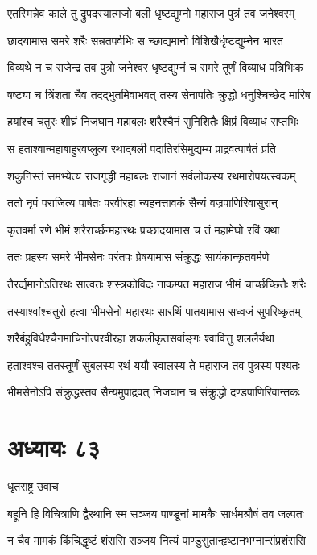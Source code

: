 \twolineshloka
{एतस्मिन्नेव काले तु द्रुपदस्यात्मजो बली}
{धृष्टद्युम्नो महाराज पुत्रं तव जनेश्वरम्}


\twolineshloka
{छादयामास समरे शरैः सन्नतपर्वभिः}
{स च्छाद्यमानो विशिखैर्धृष्टद्युम्नेन भारत}


\twolineshloka
{विव्यथे न च राजेन्द्र तव पुत्रो जनेश्वर}
{धृष्टद्युम्नं च समरे तूर्णं विव्याध पत्रिभिःक}


\twolineshloka
{षष्ट्या च त्रिंशता चैव तदद्भुतमिवाभवत्}
{तस्य सेनापतिः क्रुद्धो धनुश्चिच्छेद मारिष}


\twolineshloka
{हयांश्च चतुरः शीघ्रं निजघान महाबलः}
{शरैश्चैनं सुनिशितैः क्षिप्रं विव्याध सप्तभिः}


\twolineshloka
{स हताश्वान्महाबाहुरवप्लुत्य रथाद्बली}
{पदातिरसिमुद्यम्य प्राद्रवत्पार्षतं प्रति}


\twolineshloka
{शकुनिस्तं समभ्येत्य राजगृद्धी महाबलः}
{राजानं सर्वलोकस्य रथमारोपयत्स्वकम्}


\twolineshloka
{ततो नृपं पराजित्य पार्षतः परवीरहा}
{न्यहनत्तावकं सैन्यं वज्रपाणिरिवासुरान्}


\twolineshloka
{कृतवर्मा रणे भीमं शरैरार्च्छन्महारथः}
{प्रच्छादयामास च तं महामेघो रविं यथा}


\twolineshloka
{ततः प्रहस्य समरे भीमसेनः परंतपः}
{प्रेषयामास संक्रुद्धः सायंकान्कृतवर्मणे}


\twolineshloka
{तैरर्द्यमानोऽतिरथः सात्वतः शस्त्रकोविदः}
{नाकम्पत महाराज भीमं चार्च्छच्छितैः शरैः}


\twolineshloka
{तस्याश्वांश्चतुरो हत्वा भीमसेनो महारथः}
{सारथिं पातयामास सध्वजं सुपरिष्कृतम्}


\twolineshloka
{शरैर्बहुविधैश्चैनमाचिनोत्परवीरहा}
{शकलीकृतसर्वाङ्गः श्वावित्तु शललैर्यथा}


\twolineshloka
{हताश्वश्च ततस्तूर्णं सुबलस्य रथं ययौ}
{स्वालस्य ते महाराज तव पुत्रस्य पश्यतः}


\twolineshloka
{भीमसेनोऽपि संक्रुद्धस्तव सैन्यमुपाद्रवत्}
{निजघान च संक्रुद्धो दण्डपाणिरिवान्तकः}


\chapter{अध्यायः ८३}
\twolineshloka
{धृतराष्ट्र उवाच}
{}


\twolineshloka
{बहूनि हि विचित्राणि द्वैरथानि स्म सञ्जय}
{पाण्डूनां मामकैः सार्धमश्रौषं तव जल्पतः}


\twolineshloka
{न चैव मामकं किंचिद्धृष्टं शंससि सञ्जय}
{नित्यं पाण्डुसुतान्हृष्टानभग्नान्संप्रशंससि}


